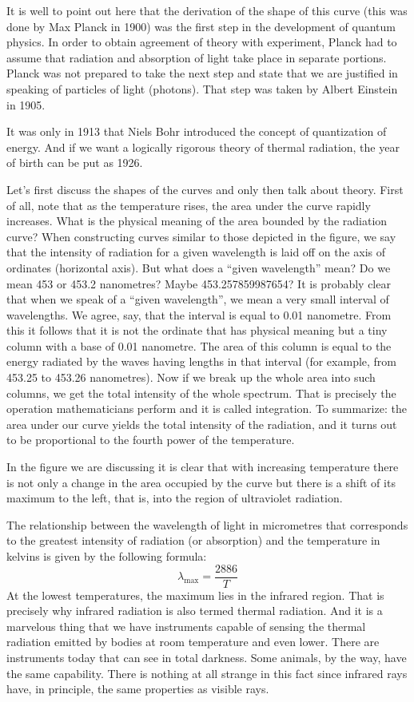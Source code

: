 It is well to point out here that the derivation of the shape of this curve (this was done by Max Planck in 1900) was the first step in the development of quantum physics. In order to obtain agreement of theory with experiment, Planck had to assume that radiation and absorption of light take place in separate portions. Planck was not prepared to take the next step and state that we are justified in speaking of particles of light (photons). That step was taken by Albert Einstein in 1905.

It was only in 1913 that Niels Bohr introduced the concept of quantization of energy. And if we want a logically rigorous theory of thermal radiation, the year of birth can be put as 1926.

Let's first discuss the shapes of the curves and only then talk about theory. First of all, note that as the temperature rises, the area under the curve rapidly increases. What is the physical meaning of the area bounded by the radiation curve? When constructing curves similar to those depicted in the figure, we say that the intensity of radiation for a given wavelength is laid off on the axis of ordinates (horizontal axis). But what does a ``given wavelength'' mean? Do we mean 453 or 453.2 nanometres? Maybe \num{453.257859987654}? It is probably clear that when we speak of a ``given wavelength'', we mean a very small interval of wavelengths. We agree, say, that the interval is equal to 0.01 nanometre. From this it follows that it is not the ordinate that has physical meaning but a tiny column with a base of 0.01 nanometre. The area of this column is equal to the energy radiated by the waves having lengths in that interval (for example, from 453.25 to 453.26 nanometres). Now if we break up the whole area into such columns, we get the total intensity of the whole spectrum. That is precisely the operation mathematicians perform and it is called integration. To summarize: the area under our curve yields the total intensity of the radiation, and it turns out to be proportional to the fourth power of the temperature.


In the figure we are discussing it is clear that with increasing temperature there is not only a change in the area occupied by the curve but there is a shift of its maximum to the left, that is, into the region of ultraviolet radiation.

The relationship between the wavelength of light in micrometres that corresponds to the greatest intensity of radiation (or absorption) and the temperature in kelvins is given by the following formula:
\begin{equation*}%
\lambda_{\textrm{max}} = \frac{2886}{T}
\label{lambdamax}
\end{equation*}
At the lowest temperatures, the maximum lies in the infrared region. That is precisely why infrared radiation is also termed thermal radiation. And it is a marvelous thing that we have instruments capable of sensing the thermal radiation emitted by bodies at room temperature and even lower. There are instruments today that can see in total darkness. Some animals, by the way, have the same capability. There is nothing at all strange in this fact since infrared rays have, in principle, the same properties as visible rays.


